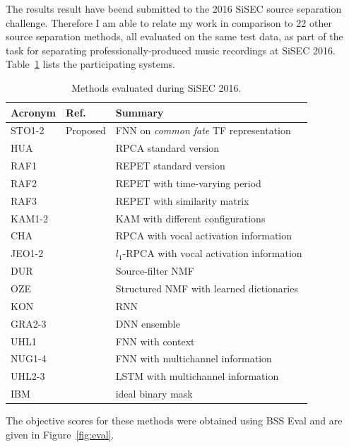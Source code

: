 
The results result have beend submitted to the 2016 SiSEC source separation challenge.
Therefore I am able to relate my work in comparison to $22$ other source separation methods, all evaluated on the same test data, as part of the task for separating professionally-produced music recordings at SiSEC 2016.
Table~\ref{tab:sisec_systems} lists the participating systems.
\begin{table}[htbp]
	\centering
	\caption{Methods evaluated during SiSEC 2016.}
	\label{tab:sisec_systems}
	\begin{tabular}{lll@{}}
		\hline
		\textbf{Acronym} & \textbf{Ref.} & \textbf{Summary}\\
		\hline
    STO1-2 & Proposed & FNN on \textit{common fate} TF representation \\
		HUA & \cite{huang12} & RPCA standard version \\
		RAF1 & \cite{rafii13} & REPET standard version \\
		RAF2 & \cite{liutkus12} & REPET with time-varying period \\
		RAF3 & \cite{rafii12} & REPET with similarity matrix \\
		KAM1-2 & \cite{liutkus15} & KAM with different configurations \\
		CHA & \cite{chan15} & RPCA with vocal activation information \\
		JEO1-2 & \cite{jeong17} &  $l_1$-RPCA with vocal activation information \\
		DUR & \cite{durrieu11} & Source-filter NMF \\
		OZE & \cite{salaun14} & Structured NMF with learned dictionaries \\
		KON & \cite{huang15} & RNN \\
		GRA2-3 & \cite{grais16} & DNN ensemble \\
		UHL1 & \cite{uhlich15} & FNN with context \\
		NUG1-4 & \cite{nugraha16} & FNN with multichannel information \\
		UHL2-3 & \cite{uhlich17} & LSTM with multichannel information \\
		IBM & & ideal binary mask \\
	\end{tabular}
\end{table}

The objective scores for these methods were obtained using BSS Eval and are given in Figure~\ref{fig:eval}.


